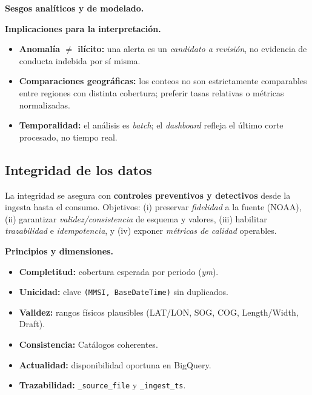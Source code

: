 \documentclass[10pt]{article}
\begin{document}
\vspace{0.1cm}
\noindent\textbf{Sesgos analíticos y de modelado.}

\vspace{0.2cm}
\noindent\textbf{Implicaciones para la interpretación.}
\begin{itemize}
  \item \textbf{Anomalía $\neq$ ilícito:} una alerta es un \emph{candidato a revisión}, no evidencia de conducta indebida por sí misma.
  \item \textbf{Comparaciones geográficas:} los conteos no son estrictamente comparables entre regiones con distinta cobertura; preferir tasas relativas o métricas normalizadas.
  \item \textbf{Temporalidad:} el análisis es \textit{batch}; el \textit{dashboard} refleja el último corte procesado, no tiempo real.
\end{itemize}

\subsection{Integridad de los datos}
\label{sec:integridad}

La integridad se asegura con \textbf{controles preventivos y detectivos} desde la ingesta hasta el consumo. Objetivos: (i) preservar \emph{fidelidad} a la fuente (NOAA), (ii) garantizar \emph{validez/consistencia} de esquema y valores, (iii) habilitar \emph{trazabilidad} e \emph{idempotencia}, y (iv) exponer \emph{métricas de calidad} operables.

\vspace{0.2cm}
\noindent\textbf{Principios y dimensiones.}
\begin{itemize}
  \item \textbf{Completitud:} cobertura esperada por periodo (\emph{ym}).
  \item \textbf{Unicidad:} clave \texttt{(MMSI, BaseDateTime)} sin duplicados.
  \item \textbf{Validez:} rangos físicos plausibles (LAT/LON, SOG, COG, Length/Width, Draft).
  \item \textbf{Consistencia:} Catálogos coherentes.
  \item \textbf{Actualidad:} disponibilidad oportuna en BigQuery.
  \item \textbf{Trazabilidad:} \texttt{\_source\_file} y \texttt{\_ingest\_ts}.
\end{itemize}
\end{document}
